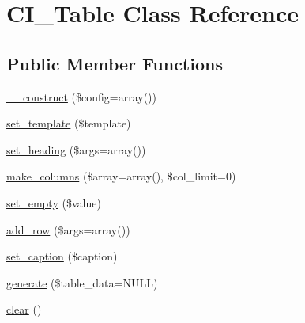 \hypertarget{class_c_i___table}{}\section{C\+I\+\_\+\+Table Class Reference}
\label{class_c_i___table}
\subsection*{Public Member Functions}
\begin{DoxyCompactItemize}
\item 
\mbox{\hyperlink{class_c_i___table_af7f9493844d2d66e924e3c1df51ce616}{\+\_\+\+\_\+construct}} (\$config=array())
\item 
\mbox{\hyperlink{class_c_i___table_ae65d1ab2a626d4ddfda31befc2b347f6}{set\+\_\+template}} (\$template)
\item 
\mbox{\hyperlink{class_c_i___table_ac35607094955ce966330d6af51d221ef}{set\+\_\+heading}} (\$args=array())
\item 
\mbox{\hyperlink{class_c_i___table_a816eac03a6a38820918890170fd7e0d0}{make\+\_\+columns}} (\$array=array(), \$col\+\_\+limit=0)
\item 
\mbox{\hyperlink{class_c_i___table_a20b008428100a2b740c02c4bcaa45cf6}{set\+\_\+empty}} (\$value)
\item 
\mbox{\hyperlink{class_c_i___table_aed032b02068e33116d9ecf9a0eedbbbe}{add\+\_\+row}} (\$args=array())
\item 
\mbox{\hyperlink{class_c_i___table_ab6146f0f242d4bc75169c8f8e622e979}{set\+\_\+caption}} (\$caption)
\item 
\mbox{\hyperlink{class_c_i___table_ad46f79939e16f261c19157809d56aab8}{generate}} (\$table\+\_\+data=N\+U\+LL)
\item 
\mbox{\hyperlink{class_c_i___table_aa821bec12eaa7e0f649397c9675ff505}{clear}} ()
\end{DoxyCompactItemize}
